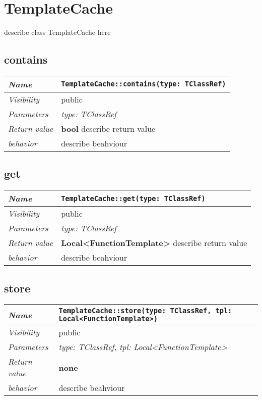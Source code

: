 \chapter{TemplateCache}
describe class TemplateCache here
\section{contains}
\begin{longtable}{p{3cm} @{\hskip 1cm} p{12cm}}
 \hline
\textit{Name} & \texttt{TemplateCache::contains(type: TClassRef)}\\
\hline
 \textit{Visibility} & public\\
\hline
\textit{Parameters} & \textit{type: TClassRef}\\
\hline
\textit{Return value} & \textbf{ bool} describe return value\\
  \hline
 \textit{behavior} & describe beahviour \\
\hline
\end{longtable} \pagebreak
 \section{get}
\begin{longtable}{p{3cm} @{\hskip 1cm} p{12cm}}
 \hline
\textit{Name} & \texttt{TemplateCache::get(type: TClassRef)}\\
\hline
 \textit{Visibility} & public\\
\hline
\textit{Parameters} & \textit{type: TClassRef}\\
\hline
\textit{Return value} & \textbf{ Local<FunctionTemplate>} describe return value\\
  \hline
 \textit{behavior} & describe beahviour \\
\hline
\end{longtable} \pagebreak
 \section{store}
\begin{longtable}{p{3cm} @{\hskip 1cm} p{12cm}}
 \hline
\textit{Name} & \texttt{TemplateCache::store(type: TClassRef, tpl: Local<FunctionTemplate>)}\\
\hline
 \textit{Visibility} & public\\
\hline
\textit{Parameters} & \textit{type: TClassRef, tpl: Local<FunctionTemplate>}\\
\hline
\textit{Return value} & \textbf{none}\\
  \hline
 \textit{behavior} & describe beahviour \\
\hline
\end{longtable} \pagebreak
 